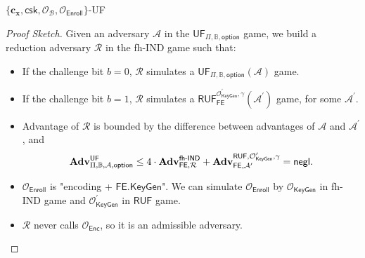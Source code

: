\begin{frame}{$\{ \mathbf{c_x}, \textsf{csk}, \mathcal{O}_\mathcal{B}, \mathcal{O}_{\textsf{Enroll}} \}$-UF}

\begin{proof}[Proof Sketch]

Given an adversary $\mathcal{A}$ in the $\textsf{UF}_{\Pi, \mathbb{B}, \textsf{option}}$ game, we build a reduction adversary $\mathcal{R}$ in the fh-IND game such that:

\begin{itemize}
	\item<2-> If the challenge bit $b = 0$, $\mathcal{R}$ simulates a $\textsf{UF}_{\Pi, \mathbb{B}, \textsf{option}}(\mathcal{A})$ game.

	\item<3-> If the challenge bit $b = 1$, $\mathcal{R}$ simulates a $\textsf{RUF}^{\mathcal{O}^\prime_{\textsf{KeyGen}}, \gamma}_{\textsf{FE}}(\mathcal{A}^\prime)$ game, for some $\mathcal{A}^\prime$.

	\item<4-> Advantage of $\mathcal{R}$ is bounded by the difference between advantages of $\mathcal{A}$ and $\mathcal{A}^\prime$, and
	\[
		\mathbf{Adv}^{\textsf{UF}}_{\Pi, \mathbb{B}, \mathcal{A}, \textsf{option}} \leq 4 \cdot \mathbf{Adv}_{\textsf{FE}, \mathcal{R}}^{\textsf{fh-IND}} + \mathbf{Adv}_{\textsf{FE}, \mathcal{A}^\prime}^{\textsf{RUF},\mathcal{O}^\prime_{\textsf{KeyGen}}, \gamma} = \mathsf{negl}.
	\]

	\item<5-> $\mathcal{O}_{\textsf{Enroll}}$ is "encoding + $\textsf{FE.KeyGen}$". We can simulate $\mathcal{O}_{\textsf{Enroll}}$ by $\mathcal{O}_{\textsf{KeyGen}}$ in fh-IND game and $\mathcal{O}^\prime_{\textsf{KeyGen}}$ in $\textsf{RUF}$ game. 
	
	\item<6-> $\mathcal{R}$ never calls $\mathcal{O}_{\textsf{Enc}}$, so it is an admissible adversary.

\end{itemize}

\end{proof}

\end{frame}



